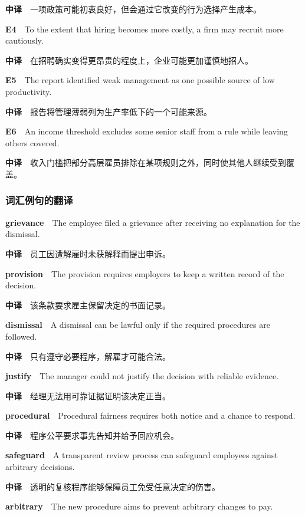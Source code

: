 \documentclass[
  11pt,
]{ctexart}
\begin{document}
\textbf{中译}　一项政策可能初衷良好，但会通过它改变的行为选择产生成本。

\textbf{E4}　To the extent that hiring becomes more costly, a firm may
recruit more cautiously.

\textbf{中译}　在招聘确实变得更昂贵的程度上，企业可能更加谨慎地招人。

\textbf{E5}　The report identified weak management as one possible
source of low productivity.

\textbf{中译}　报告将管理薄弱列为生产率低下的一个可能来源。

\textbf{E6}　An income threshold excludes some senior staff from a rule
while leaving others covered.

\textbf{中译}　收入门槛把部分高层雇员排除在某项规则之外，同时使其他人继续受到覆盖。

\subsubsection{词汇例句的翻译}\label{ux8bcdux6c47ux4f8bux53e5ux7684ux7ffbux8bd1-1}

\textbf{grievance}　The employee filed a grievance after receiving no
explanation for the dismissal.

\textbf{中译}　员工因遭解雇时未获解释而提出申诉。

\textbf{provision}　The provision requires employers to keep a written
record of the decision.

\textbf{中译}　该条款要求雇主保留决定的书面记录。

\textbf{dismissal}　A dismissal can be lawful only if the required
procedures are followed.

\textbf{中译}　只有遵守必要程序，解雇才可能合法。

\textbf{justify}　The manager could not justify the decision with
reliable evidence.

\textbf{中译}　经理无法用可靠证据证明该决定正当。

\textbf{procedural}　Procedural fairness requires both notice and a
chance to respond.

\textbf{中译}　程序公平要求事先告知并给予回应机会。

\textbf{safeguard}　A transparent review process can safeguard employees
against arbitrary decisions.

\textbf{中译}　透明的复核程序能够保障员工免受任意决定的伤害。

\textbf{arbitrary}　The new procedure aims to prevent arbitrary changes
to pay.
\end{document}
